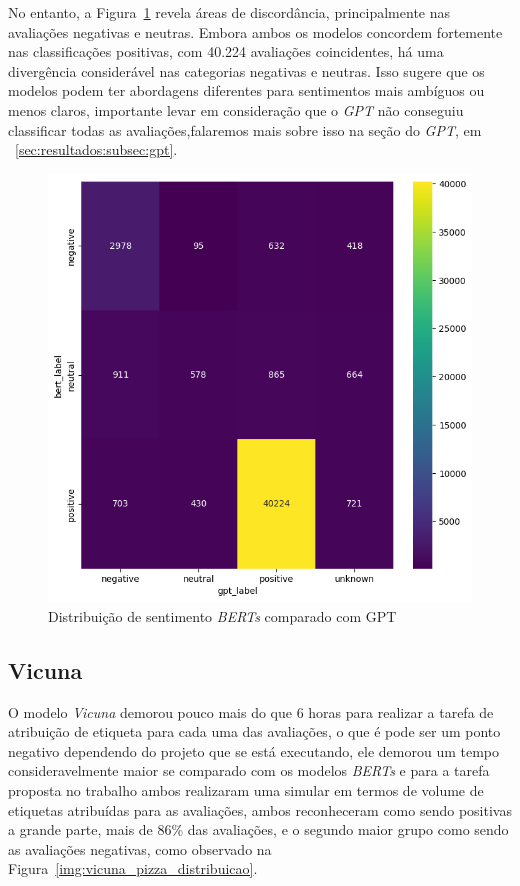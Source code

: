 No entanto, a Figura~\ref{img:heat_bert_vs_gpt} revela áreas de discordância, principalmente nas avaliações negativas e neutras. Embora ambos os modelos concordem fortemente nas classificações positivas, com 40.224 avaliações coincidentes, há uma divergência considerável nas categorias negativas e neutras. Isso sugere que os modelos podem ter abordagens diferentes para sentimentos mais ambíguos ou menos claros, importante levar em consideração que o \textit{GPT} não conseguiu classificar todas as avaliações,falaremos mais sobre isso na seção do \textit{GPT}, em ~\ref{sec:resultados:subsec:gpt}.

\begin{figure}
	\centering
	\includegraphics[width=.8\textwidth]{figs/bert/heat_vs_gpt.png}
	\caption{Distribuição de sentimento \textit{BERTs} comparado com GPT}
	\label{img:heat_bert_vs_gpt}
\end{figure}


\subsection{Vicuna}
\label{sec:resultados:subsec:vicuna}


O modelo \textit{Vicuna} demorou pouco mais do que 6 horas para realizar a tarefa de atribuição de etiqueta para cada uma das avaliações, o que é pode ser um ponto negativo dependendo do projeto que se está executando, ele demorou um tempo consideravelmente maior se comparado com os modelos \textit{BERTs} e para a tarefa proposta no trabalho ambos realizaram uma simular em termos de volume de etiquetas atribuídas para as avaliações, ambos reconheceram como sendo positivas a grande parte, mais de 86\% das avaliações, e o segundo maior grupo como sendo as avaliações negativas, como observado na Figura~\ref{img:vicuna_pizza_distribuicao}.

